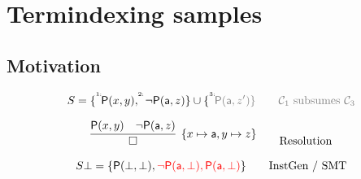 
\section{Termindexing samples}
\subsection{Motivation}



\begin{example}
	\begin{gather*}
	S = \{ \TI{1}\mP(x,y), \TI{2}\lnot \mP(\ma,z)\} \cup \{\TI{3}\colG\mP(\ma,z') \}
	\tag*{$\mcC_1$ subsumes $\mcC_3$}
	\\[0.7em]
	\infer[\{x\mapsto\ma,y\mapsto z\}]
	{\square}
	{\mP(x,y) & \lnot \mP(\ma,z)}
	\tag*{Resolution}
	\\[0.7em]
	S\bot = \{ \mP(\bot,\bot), {\colLo\lnot \mP(\ma,\bot), \mP(\ma,\bot)} \}
	\tag*{InstGen / SMT}
	\end{gather*}
\end{example}


